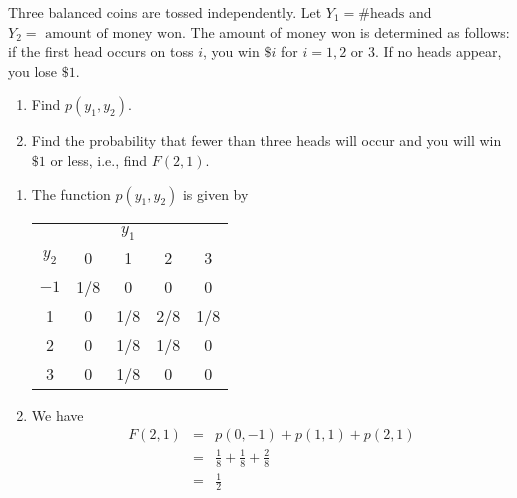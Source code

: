 \begin{exercise}{}{}
Three balanced coins are tossed independently. Let $Y_1 = \#\text{heads}$ and $Y_2 = \text{ amount of money won}$. The amount of money won is determined as follows: if the first head occurs on toss $i$, you win $\$i$ for $i=1, 2\text{ or }3$. If no heads appear, you lose $\$1$.
	\begin{enumerate}
		\item Find $p(y_1, y_2)$.
		\item Find the probability that fewer than three heads will occur and you will win $\$1$ or less, i.e., find $F(2,1)$.
	\end{enumerate}
\end{exercise}
\begin{solution}
	\begin{enumerate}
		\item The function $p(y_1, y_2)$ is given by
		\begin{center}
			\begin{tabular}{c | c c c c}
				& & $y_1$ & & \\ \cline{2-5}
				$y_2$& 0 & 1 & 2 & 3 \\ \hline 
				$-1$ & 1/8 & 0 & 0 & 0 \\
				1 & 0 & 1/8 & 2/8 & 1/8 \\
				2 & 0 & 1/8 & 1/8 & 0 \\
				3 & 0 & 1/8 & 0 & 0
			\end{tabular}
		\end{center}
		\item We have
		\begin{eqnarray*}
			F(2,1) &=& p(0,-1) + p(1,1) + p(2,1) \\
			&=& \frac{1}{8} + \frac{1}{8} + \frac{2}{8}\\
			&=& \frac{1}{2} 
		\end{eqnarray*}
	\end{enumerate}
\end{solution}

\begin{exercise}{}{}
	
\end{exercise}